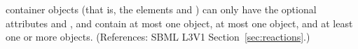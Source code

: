 \ListOfSpeciesReferences container objects (that is, the \Reaction elements
 and ) can only have the
optional attributes  and , and contain at most
one \Notes object, at most one \Annotation object, and at least one or more
\SpeciesReference objects.  (References: SBML L3V1
Section~\ref{sec:reactions}.)
